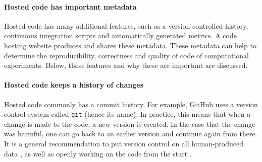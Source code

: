 \paragraph{Hosted code has important metadata}

Hosted code has many additional features, such as
a version-controlled history, continuous integration scripts
and automatically generated metrics.
A code hosting website produces and shares these metadata.
These metadata can help to determine the
reproducibility, correctness and quality of code
of computational experiments.
Below, those features and why these are important are discussed.

\paragraph{Hosted code keeps a history of changes}

Hosted code commonly has a commit history. For example, GitHub
uses a version control system called \verb|git| (hence its name).
In practice, this means that when a change is made to the code,
a new version is created. In the case that the change was harmful,
one can go back to an earlier version and continue again from there.
It is a general recommendation to put version control
on all human-produced data \cite{wilson2014best},
as well as openly working on the code from the start \cite{jimenez2017four}.

